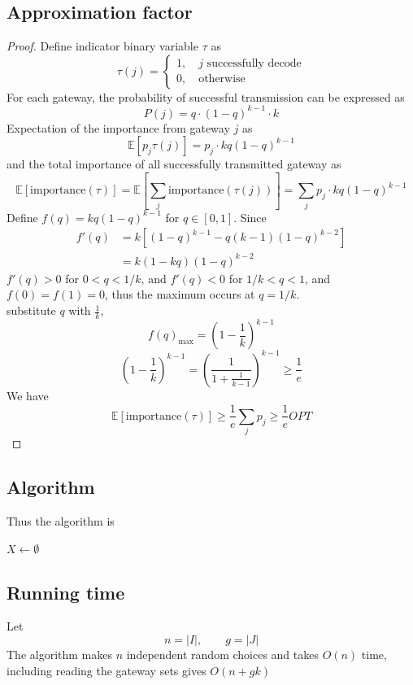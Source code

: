 \documentclass[10pt]{article}
\theoremstyle{definition}
\begin{document}
\subsection{Approximation factor}
\begin{proof}
  Define indicator binary variable $\tau$ as
  \[\tau(j) = \begin{cases}
    1, \quad j \text{ successfully decode}\\
    0, \quad \text{otherwise}
  \end{cases}\]
  For each gateway, the probability of successful transmission can be expressed as 
  \[P(j) = q \cdot (1 - q)^{k - 1} \cdot k\]
  Expectation of the importance from gateway $j$ as
  \[\mathbb{E}[p_j\tau(j)] = p_j \cdot kq(1-q)^{k-1}\]
  and the total importance of all successfully transmitted gateway as 
  \[\mathbb{E}[\text{importance}(\tau)] = \mathbb{E}[\sum_j \text{importance}(\tau(j))] = 
  \sum_j p_j\cdot kq(1-q)^{k-1}\]
Define $f(q)=kq(1-q)^{k-1}$ for $q\in[0,1]$.
Since
  \begin{align*}
  f'(q) &= k[(1 - q)^{k-1} - q(k-1)(1-q)^{k - 2}]\\
    &= k(1-kq)(1-q)^{k-2}
  \end{align*}
$f'(q)>0$ for $0<q<1/k$, and $f'(q)<0$
for $1/k<q<1$, and $f(0)=f(1)=0$, thus
the maximum occurs at $q=1/k$.\\  
  substitute $q$ with $\frac{1}{k}$, 
  \[f(q)_{\max} = (1 - \frac{1}{k})^{k - 1}\]
  \[(1 - \frac{1}{k})^{k-1} = \left(\frac{1}{1 + \frac{1}{k - 1}}\right)^{k-1} \geq \frac{1}{e}\]
  We have 
  \[\mathbb{E}[\text{importance}(\tau)] \geq \frac{1}{e} \sum_j p_j \geq \frac{1}{e} OPT\]
\end{proof}
\subsection{Algorithm}
Thus the algorithm is \\
\begin{algorithm}[H]
  $X\gets\emptyset$\;
  \;
\end{algorithm}
\subsection{Running time}
Let 
\[n=|I|, \qquad g=|J|\]
The algorithm makes $n$ independent random choices and takes
$O(n)$ time, 
including reading the gateway sets gives
$O(n+gk)$ 
\end{document}
